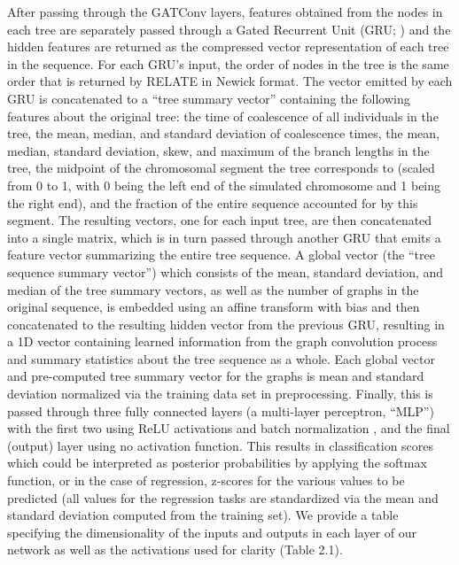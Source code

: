 After passing through the GATConv layers, features obtained from the nodes in each tree are separately passed through a Gated Recurrent Unit (GRU; \cite{choLearningPhraseRepresentations2014}) and the hidden features are returned as the compressed vector representation of each tree in the sequence. For each GRU's input, the order of nodes in the tree is the same order that is returned by RELATE in Newick format. The vector emitted by each GRU is concatenated to a “tree summary vector” containing the following features about the original tree: the time of coalescence of all individuals in the tree, the mean, median, and standard deviation of coalescence times, the mean, median, standard deviation, skew, and maximum of the branch lengths in the tree, the midpoint of the chromosomal segment the tree corresponds to (scaled from 0 to 1, with 0 being the left end of the simulated chromosome and 1 being the right end), and the fraction of the entire sequence accounted for by this segment. The resulting vectors, one for each input tree, are then concatenated into a single matrix, which is in turn passed through another GRU that emits a feature vector summarizing the entire tree sequence. A global vector (the “tree sequence summary vector”) which consists of the mean, standard deviation, and median of the tree summary vectors, as well as the number of graphs in the original sequence, is embedded using an affine transform with bias and then concatenated to the resulting hidden vector from the previous GRU, resulting in a 1D vector containing learned information from the graph convolution process and summary statistics about the tree sequence as a whole. Each global vector and pre-computed tree summary vector for the graphs is mean and standard deviation normalized via the training data set in preprocessing. Finally, this is passed through three fully connected layers (a multi-layer perceptron, “MLP”) with the first two using ReLU activations and batch normalization \cite{ioffeBatchNormalizationAccelerating2015}, and the final (output) layer using no activation function. This results in classification scores which could be interpreted as posterior probabilities by applying the softmax function, or in the case of regression, z-scores for the various values to be predicted (all values for the regression tasks are standardized via the mean and standard deviation computed from the training set). We provide a table specifying the dimensionality of the inputs and outputs in each layer of our network as well as the activations used for clarity (Table 2.1).

